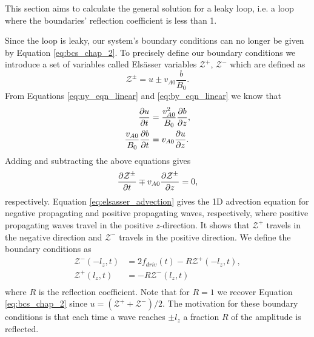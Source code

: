 This section aims to calculate the general solution for a leaky loop, i.e. a loop where the boundaries' reflection coefficient is less than 1.

Since the loop is leaky, our system's boundary conditions can no longer be given by Equation \eqref{eq:bcs_chap_2}. To precisely define our boundary conditions we introduce a set of variables called Els\"asser variables $\mathcal{Z}^+$, $\mathcal{Z}^-$ which are defined as
\begin{equation}
    \label{eq:elsasser_z}
    \mathcal{Z}^\pm = u \pm v_{A0}\frac{b}{B_0}.
\end{equation}
From Equations \eqref{eq:uy_eqn_linear} and \eqref{eq:by_eqn_linear} we know that
\begin{equation}
    \begin{aligned}
    \pdv{u}{t} &= \frac{v_{A0}^2}{B_0}\pdv{b}{z}, \\
    \frac{v_{A0}}{B_0}\pdv{b}{t} &= v_{A0}\pdv{u}{z}.
    \end{aligned}
\end{equation}
Adding and subtracting the above equations gives
\begin{equation}
    \label{eq:elsasser_advection}
    \pdv{\mathcal{Z}^\pm}{t}\mp v_{A0}\pdv{\mathcal{Z}^\pm}{z}=0,
\end{equation}
respectively. Equation \eqref{eq:elsasser_advection} gives the 1D advection equation for negative propagating and positive propagating waves, respectively, where positive propagating waves travel in the positive $z$-direction. It shows that $\mathcal{Z}^+$ travels in the negative direction and $\mathcal{Z}^-$ travels in the positive direction. We define the boundary conditions as 
\begin{equation}
    \label{eq:bcs_elsasser}
    \begin{aligned}
    \mathcal{Z}^-(-l_z, t) &= 2f_{driv}(t) - R \mathcal{Z}^+(-l_z, t), \\
    \mathcal{Z}^+(l_z, t) &= -R \mathcal{Z}^-(l_z, t) \\
    \end{aligned}
\end{equation}
where $R$ is the reflection coefficient. Note that for $R=1$ we recover Equation \eqref{eq:bcs_chap_2} since $u = (\mathcal{Z}^+ + \mathcal{Z}^-) / 2$. The motivation for these boundary conditions is that each time a wave reaches $\pm l_z$ a fraction $R$ of the amplitude is reflected.


